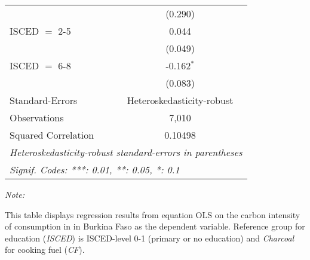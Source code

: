 \begin{table}[htbp!]
\begin{adjustbox}{width = 1\textwidth, max height = 0.95\textheight, center}
\begin{threeparttable}[b]
\begin{tabular}{lc}
                                & (0.290)\\   
            ISCED $=$ 2-5       & 0.044\\   
                                & (0.049)\\   
            ISCED $=$ 6-8       & -0.162$^{*}$\\   
                                & (0.083)\\   
            \midrule 
            Standard-Errors     & Heteroskedasticity-robust \\   
            Observations        & 7,010\\  
            Squared Correlation & 0.10498\\  
            \midrule \midrule
            \multicolumn{2}{l}{\emph{Heteroskedasticity-robust standard-errors in parentheses}}\\
            \multicolumn{2}{l}{\emph{Signif. Codes: ***: 0.01, **: 0.05, *: 0.1}}\\
         \end{tabular}
         
         \begin{tablenotes}\item \medskip \textit{Note:}
            \item This table displays regression results from equation OLS on the carbon intensity of consumption in  in Burkina Faso as the dependent variable. Reference group for education (\textit{ISCED}) is ISCED-level 0-1 (primary or no education) and \textit{Charcoal} for cooking fuel (\textit{CF}).
         \end{tablenotes}
      \end{threeparttable}
   \end{adjustbox}
\end{table}


